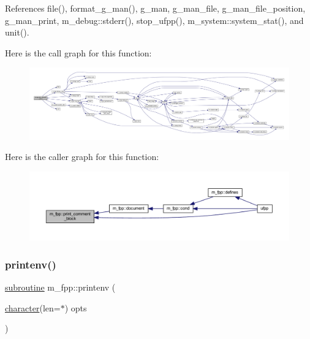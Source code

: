 References file(), format\+\_\+g\+\_\+man(), g\+\_\+man, g\+\_\+man\+\_\+file, g\+\_\+man\+\_\+file\+\_\+position, g\+\_\+man\+\_\+print, m\+\_\+debug\+::stderr(), stop\+\_\+ufpp(), m\+\_\+system\+::system\+\_\+stat(), and unit().

Here is the call graph for this function\+:
\nopagebreak
\begin{figure}[H]
\begin{center}
\leavevmode
\includegraphics[width=350pt]{namespacem__fpp_a27e4c26021feb655e915c1835e40e8f4_cgraph}
\end{center}
\end{figure}
Here is the caller graph for this function\+:
\nopagebreak
\begin{figure}[H]
\begin{center}
\leavevmode
\includegraphics[width=350pt]{namespacem__fpp_a27e4c26021feb655e915c1835e40e8f4_icgraph}
\end{center}
\end{figure}
\mbox{\label{namespacem__fpp_a8034546d38694c17677cf638e2760d43}} 
\subsubsection{\texorpdfstring{printenv()}{printenv()}}
{\footnotesize\ttfamily \hyperlink{M__stopwatch_83_8txt_acfbcff50169d691ff02d4a123ed70482}{subroutine} m\+\_\+fpp\+::printenv (\begin{DoxyParamCaption}\item[{\hyperlink{option__stopwatch_83_8txt_abd4b21fbbd175834027b5224bfe97e66}{character}(len=$\ast$)}]{opts }\end{DoxyParamCaption})}



